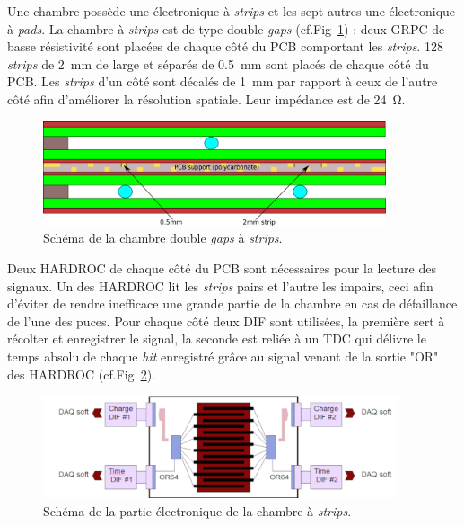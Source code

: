 Une chambre possède une électronique à \textit{strips} et les sept autres une électronique à \textit{pads}. La chambre à \textit{strips} est de type double \textit{gaps} (cf.Fig~\ref{DoubleGap}) : deux GRPC de basse résistivité sont placées de chaque côté du PCB comportant les \textit{strips}. \num{128} \textit{strips} de \SI{2}{\milli\meter} de large et séparés de \SI{0.5}{\milli\meter} sont placés de chaque côté du PCB. Les \textit{strips} d'un côté sont décalés de \SI{1}{\milli\meter} par rapport à ceux de l'autre côté afin d'améliorer la résolution spatiale. Leur impédance est de \SI{24}{\ohm}. 

\begin{figure}[ht!]
	\centering
	\includegraphics[width=0.9\textwidth]{GLA/DoubleGap.png}
	\captionsetup{type=figure}\caption{Schéma de la chambre double \textit{gaps} à \textit{strips}.}
	\label{DoubleGap}
\end{figure}

Deux HARDROC de chaque côté du PCB sont nécessaires pour la lecture des signaux. Un des HARDROC lit les \textit{strips} pairs et l'autre les impairs, ceci afin d'éviter de rendre inefficace une grande partie de la chambre en cas de défaillance de l'une des puces. Pour chaque côté deux DIF sont utilisées, la première sert à récolter et enregistrer le signal, la seconde est reliée à un TDC qui délivre le temps absolu de chaque \textit{hit} enregistré grâce au signal venant de la sortie "OR" des HARDROC (cf.Fig~\ref{SchemePS}).

\begin{figure}[ht!]
	\centering
	\includegraphics[width=0.93\textwidth]{GLA/SchemePS.png}
	\captionsetup{type=figure}\caption{Schéma de la partie électronique de la chambre à \textit{strips}.}
	\label{SchemePS}
\end{figure}

